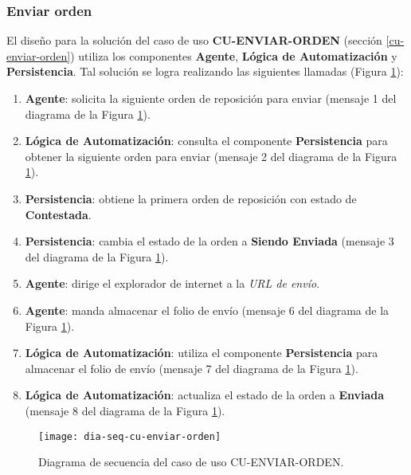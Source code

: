 \subsubsection{Enviar orden}
El diseño para la solución del caso de uso \textbf{CU-ENVIAR-ORDEN} (sección \ref{cu-enviar-orden}) utiliza los componentes \textbf{Agente}, \textbf{Lógica de Automatización} y \textbf{Persistencia}. Tal solución se logra realizando las siguientes llamadas (Figura \ref{fig:dia-seq-cu-enviar-orden}):
\begin{enumerate}
	\item \textbf{Agente}: solicita la siguiente orden de reposición para enviar (mensaje 1 del diagrama de la Figura \ref{fig:dia-seq-cu-enviar-orden}).
	\item \textbf{Lógica de Automatización}: consulta el componente \textbf{Persistencia} para obtener la siguiente orden para enviar (mensaje 2 del diagrama de la Figura \ref{fig:dia-seq-cu-enviar-orden}).
	\item \textbf{Persistencia}: obtiene la primera orden de reposición con estado de \textbf{Contestada}.
	\item \textbf{Persistencia}: cambia el estado de la orden a \textbf{Siendo Enviada} (mensaje 3 del diagrama de la Figura \ref{fig:dia-seq-cu-enviar-orden}).
	\item \textbf{Agente}: dirige el explorador de internet a la \textit{URL de envío}.
	\item \textbf{Agente}: manda almacenar el folio de envío (mensaje 6 del diagrama de la Figura \ref{fig:dia-seq-cu-enviar-orden}).
	\item \textbf{Lógica de Automatización}: utiliza el componente \textbf{Persistencia} para almacenar el folio de envío (mensaje 7 del diagrama de la Figura \ref{fig:dia-seq-cu-enviar-orden}).
	\item \textbf{Lógica de Automatización}: actualiza el estado de la orden a \textbf{Enviada} (mensaje 8 del diagrama de la Figura \ref{fig:dia-seq-cu-enviar-orden}).
\end{enumerate}
\begin{figure}[h]
	\centering
	\texttt{[image: dia-seq-cu-enviar-orden]}
	\caption{Diagrama de secuencia del caso de uso CU-ENVIAR-ORDEN.}
	\label{fig:dia-seq-cu-enviar-orden}
\end{figure}
